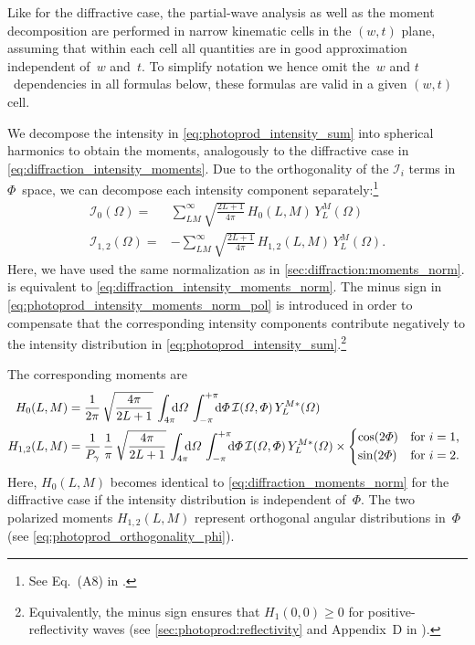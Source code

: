 Like for the diffractive case, the partial-wave analysis as well as
the moment decomposition are performed in narrow kinematic cells in
the $(w, t)$ plane, assuming that within each cell all quantities are
in good approximation independent of~$w$ and~$t$.  To simplify
notation we hence omit the~$w$ and $t$~dependencies in all formulas
below, \ie these formulas are valid in a given $(w, t)$ cell.

We decompose the intensity in \cref{eq:photoprod_intensity_sum} into
spherical harmonics to obtain the moments, analogously to the
diffractive case in \cref{eq:diffraction_intensity_moments}.  Due to
the orthogonality of the $\mathcal{I}_i$ terms in $\Phi$~space, we can
decompose each intensity component separately:\footnote{See Eq.~(A8)
in .}
\begin{align}
  \label{eq:photoprod_intensity_moments_norm_unpol}
  \mathcal{I}_0(\Omega)
  ={}& \sum_{L M}^\infty \sqrt{\frac{2 L + 1}{4 \pi}}\, H_0(L, M)\, Y_L^M(\Omega)
  \\
  \label{eq:photoprod_intensity_moments_norm_pol}
  \mathcal{I}_{1, 2}(\Omega)
  ={}& -\sum_{L M}^\infty \sqrt{\frac{2 L + 1}{4 \pi}}\, H_{1, 2}(L, M)\, Y_L^M(\Omega).
\end{align}
Here, we have used the same normalization as in
\cref{sec:diffraction:moments_norm}.
 is equivalent to
\cref{eq:diffraction_intensity_moments_norm}.  The minus sign in
\cref{eq:photoprod_intensity_moments_norm_pol} is introduced in order
to compensate that the corresponding intensity components contribute
negatively to the intensity distribution in
\cref{eq:photoprod_intensity_sum}.\footnote{Equivalently, the minus
sign ensures that $H_1(0, 0) \geq 0$ for positive-reflectivity waves
(see \cref{sec:photoprod:reflectivity} and Appendix~D in
).}

The corresponding moments are
\begin{align}
  \label{eq:photoprod_moment_norm_unpol}
  H_0(L, M)
  ={}& \frac{1}{2 \pi}\, \sqrt{\frac{4 \pi}{2 L + 1}}\, \int_{4 \pi}\!\!\! \dif{\Omega}\, \int_{-\pi}^{+\pi}\!\!\! \dif{\Phi}\,
  \mathcal{I}(\Omega, \Phi)\, Y_L^{M *}(\Omega)
  \\
  \label{eq:photoprod_moments_norm_pol}
  H_{1, 2}(L, M)
  ={}& \frac{1}{P_\gamma}\, \frac{1}{\pi}\, \sqrt{\frac{4 \pi}{2 L + 1}}\, \int_{4 \pi}\!\!\! \dif{\Omega}\, \int_{-\pi}^{+\pi}\!\!\! \dif{\Phi}\,
  \mathcal{I}(\Omega, \Phi)\, Y_L^{M *}(\Omega) \times \begin{cases*}
    \cos(2 \Phi) & for $i = 1$, \\
    \sin(2 \Phi) & for $i = 2$.
  \end{cases*}
\end{align}
Here, $H_0(L, M)$ becomes identical to
\cref{eq:diffraction_moments_norm} for the diffractive case if the
intensity distribution is independent of~$\Phi$.  The two
polarized moments $H_{1, 2}(L, M)$ represent orthogonal angular
distributions in~$\Phi$ (see \cref{eq:photoprod_orthogonality_phi}).


